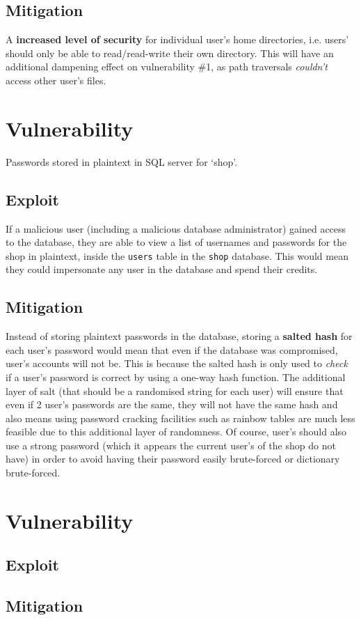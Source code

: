 \documentclass[11pt]{article}
\begin{document}
\subsection{Mitigation}

A \textbf{increased level of security} for individual user's home directories, i.e. users' should only be able to read/read-write their own directory. This will have an additional dampening effect on vulnerability \#1, as path traversals \textit{couldn't} access other user's files.

\section{Vulnerability}

Passwords stored in plaintext in SQL server for `shop'.

\subsection{Exploit}

If a malicious user (including a malicious database administrator) gained access to the database, they are able to view a list of usernames and passwords for the shop in plaintext, inside the \texttt{users} table in the \texttt{shop} database. This would mean they could impersonate any user in the database and spend their credits.

\subsection{Mitigation}

Instead of storing plaintext passwords in the database, storing a \textbf{salted hash} for each user's password would mean that even if the database was compromised, user's accounts will not be. This is because the salted hash is only used to \textit{check} if a user's password is correct by using a one-way hash function. The additional layer of salt (that should be a randomised string for each user) will ensure that even if 2 user's passwords are the same, they will not have the same hash and also means using password cracking facilities such as rainbow tables are much less feasible due to this additional layer of randomness. Of course, user's should also use a strong password (which it appears the current user's of the shop do not have) in order to avoid having their password easily brute-forced or dictionary brute-forced.

\section{Vulnerability}

\subsection{Exploit}

\subsection{Mitigation}
\end{document}
